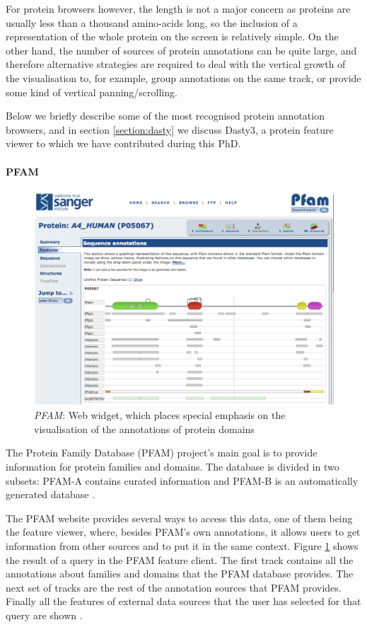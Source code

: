 For protein browsers however, the length is not a major concern as proteins are usually less than a thousand amino-acids long, so the inclusion of a representation of the whole protein on the screen is relatively simple. On the other hand, the number of sources of protein annotations can be quite large, and therefore alternative strategies are required to deal with the vertical growth of the visualisation to, for example, group annotations on the same track, or provide some kind of vertical panning/scrolling.

Below we briefly describe some of the most recognised protein annotation browsers, and in section \ref{section:dasty} we discuss Dasty3, a protein feature viewer to which we have contributed during this PhD.

\paragraph{PFAM} 

\begin{figure}[ht]
\centering
\includegraphics[width=6in]{figures/pfam.png} 
\caption[PFAM Snapshot] {\emph{PFAM}: Web widget, which places special emphasis on the visualisation of the annotations of protein domains} \label{fig: pfam}
\end{figure}

The Protein Family Database (PFAM) project's main goal is to provide information for protein families and domains. The database is divided in two subsets: PFAM-A contains curated information and PFAM-B is an automatically generated database \cite{FIN2008}. 

The PFAM website provides several ways to access this data, one of them being the feature viewer, where, besides PFAM's own annotations, it allows users to get information from other sources and to put it in the same context. Figure \ref{fig: pfam} shows the result of a query in the PFAM feature client. The first track contains all the annotations about families and domains that the PFAM database provides. The next set of tracks are the rest of the annotation sources that PFAM provides. Finally all the features of external data sources that the user has selected for that query are shown \cite{FIN2008}.

